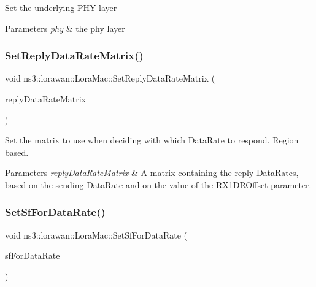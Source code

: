 Set the underlying P\+HY layer


\begin{DoxyParams}{Parameters}
{\em phy} & the phy layer \\
\hline
\end{DoxyParams}
\mbox{\label{classns3_1_1lorawan_1_1LoraMac_a669d1029ecf8039e040df55a5806cd5b}} 
\subsubsection{\texorpdfstring{Set\+Reply\+Data\+Rate\+Matrix()}{SetReplyDataRateMatrix()}}
{\footnotesize\ttfamily void ns3\+::lorawan\+::\+Lora\+Mac\+::\+Set\+Reply\+Data\+Rate\+Matrix (\begin{DoxyParamCaption}\item[{Reply\+Data\+Rate\+Matrix}]{reply\+Data\+Rate\+Matrix }\end{DoxyParamCaption})}

Set the matrix to use when deciding with which Data\+Rate to respond. Region based.


\begin{DoxyParams}{Parameters}
{\em reply\+Data\+Rate\+Matrix} & A matrix containing the reply Data\+Rates, based on the sending Data\+Rate and on the value of the R\+X1\+D\+R\+Offset parameter. \\
\hline
\end{DoxyParams}
\mbox{\label{classns3_1_1lorawan_1_1LoraMac_a54d20add4e60e76ad45bd34a95fce0c2}} 
\subsubsection{\texorpdfstring{Set\+Sf\+For\+Data\+Rate()}{SetSfForDataRate()}}
{\footnotesize\ttfamily void ns3\+::lorawan\+::\+Lora\+Mac\+::\+Set\+Sf\+For\+Data\+Rate (\begin{DoxyParamCaption}\item[{std\+::vector$<$ uint8\+\_\+t $>$}]{sf\+For\+Data\+Rate }\end{DoxyParamCaption})}

